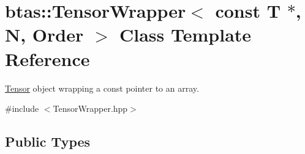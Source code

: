 \hypertarget{classbtas_1_1_tensor_wrapper_3_01const_01_t_01_5_00_01_n_00_01_order_01_4}{
\section{btas::TensorWrapper$<$ const T $\ast$, N, Order $>$ Class Template Reference}
\label{classbtas_1_1_tensor_wrapper_3_01const_01_t_01_5_00_01_n_00_01_order_01_4}
}


\hyperlink{classbtas_1_1_tensor}{Tensor} object wrapping a const pointer to an array.  


{\ttfamily \#include $<$TensorWrapper.hpp$>$}\subsection*{Public Types}
